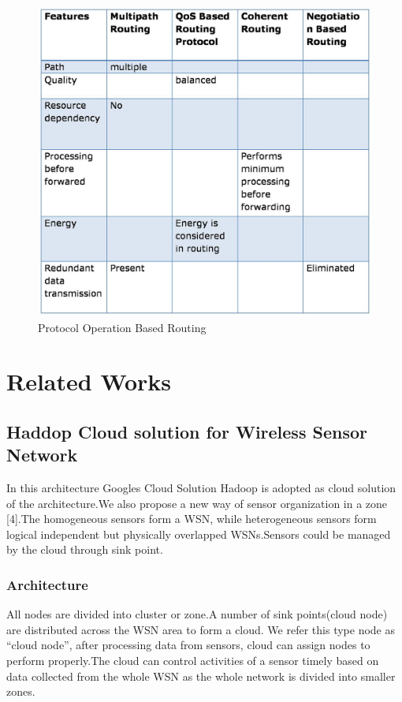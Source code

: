 \documentclass {report}
\begin{document}
\begin{figure}
\begin{center}
\includegraphics [scale=0.3]{table2}
\caption{Protocol Operation Based Routing}
\end{center}
\end{figure}


\chapter{Related Works}

\section{Haddop Cloud solution for Wireless Sensor Network}


In this architecture Googles Cloud Solution Hadoop is adopted as cloud solution of the architecture.We also propose a new way of sensor organization in a zone [4].The homogeneous sensors form a WSN, while heterogeneous 
sensors form logical independent but physically overlapped WSNs.Sensors could be managed by the cloud through sink point.

\subsection {Architecture}

All nodes are divided into cluster or zone.A number of sink points(cloud node) are distributed across the WSN area to form a cloud. We refer this type node as “cloud node”, after processing data from sensors, 
cloud can assign nodes to perform properly.The cloud can control activities of a sensor timely based on data collected from the whole WSN as the whole network is divided into smaller zones.
\end{document}
